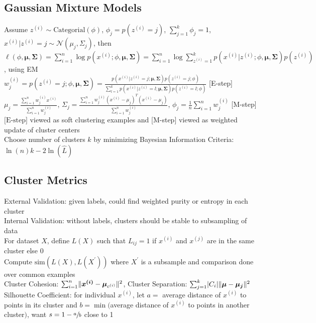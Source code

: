 \documentclass{article}
\DeclarePairedDelimiter\abs{\lvert}{\rvert}
\DeclarePairedDelimiter\norm{\lVert}{\rVert}
\begin{document}
\subsection{Gaussian Mixture Models}
Assume $z^{(i)} \sim \mbox{Categorial}(\phi)$, $\phi_j = p(z^{(i)} = j)$, $\sum_{j=1}^k \phi_j = 1$, $x^{(i)} | z^{(i)} = j \sim \mathcal{N}(\mu_j, \Sigma_j)$, then \\
$\ell(\phi, \boldsymbol \mu, \boldsymbol \Sigma) = \sum\limits_{i=1}^n \log p(x^{(i)}; \phi, \boldsymbol \mu, \boldsymbol \Sigma) = \sum\limits_{i=1}^n \log \sum\limits_{z^{(i)}=1}^k p(x^{(i)}| z^{(i)}; \phi, \boldsymbol \mu, \boldsymbol \Sigma)p(z^{(i)})$, using EM \\
$w^{(i)}_j = p(z^{(i)}=j; \phi, \boldsymbol \mu, \boldsymbol \Sigma) = \frac{p(x^{(i)}|z^{(i)}=j; \boldsymbol \mu, \boldsymbol \Sigma)p(z^{(i)}=j ; \phi)}{\sum_{l=1}^k p(x^{(i)}|z^{(i)}=l; \boldsymbol \mu, \boldsymbol \Sigma)p(z^{(i)}=l ; \phi)}$ [E-step] \\
${\mu_j} = \frac{\sum_{i=1}^n w^{(i)}_jx^{(i)}}{\sum_{i=1}^n w^{(i)}_j}$, ${\Sigma_{j}} = \frac{\sum_{i=1}^nw^{(i)}_j (x^{(i)} - {\mu_j})^T(x^{(i)} - {\mu_j})}{\sum_{i=1}^nw^{(i)}_j}$, $\phi_j = \frac{1}{n}\sum\limits_{i=1}^n w^{(i)}_j$ [M-step] \\
$\mbox{[E-step]}$ viewed as soft clustering examples and [M-step] viewed as weighted update of cluster centers \\
Choose number of clusters $k$ by minimizing Bayesian Information Criteria: $\ln(n)k - 2\ln(\hat L)$ 

\subsection{Cluster Metrics}
External Validation: given labels, could find weighted purity or entropy in each cluster \\
Internal Validation: without labels, clusters should be stable to subsampling of data \\
For dataset $X$, define $L(X)$ such that $L_{ij} = 1$ if $x^{(i)}$ and $x^{(j)}$ are in the same cluster else $0$ \\
Compute $\mbox{sim}(L(X), L(X^\prime))$ where $X^\prime$ is a subsample and comparison done over common examples \\
Cluster Cohesion: $\sum_{i=1}^n \norm{\boldsymbol{x^{(i)}} - \boldsymbol \mu_{c^{(i)}}}^2$, Cluster Separation: $\sum_{j=1}^k \abs{C_i} \norm{\boldsymbol \mu - \boldsymbol{\mu_j}}^2$\\
Silhouette Coefficient: for individual $x^{(i)}$, let $a = $ average distance of $x^{(i)}$ to points in its cluster and $b = \min($average distance of $x^{(i)}$ to points in another cluster$)$, want $s = 1- \sfrac{a}{b}$ close to 1 
\end{document}
